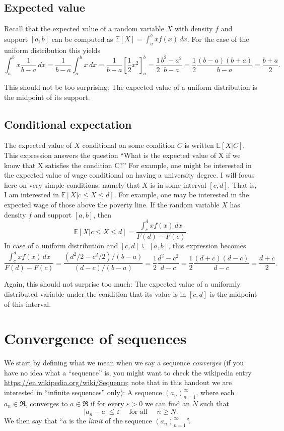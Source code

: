 \documentclass[a4paper,12pt]{article}
\theoremstyle{plain}
\begin{document}
\subsection{Expected value}
\label{sec:expected-value}

Recall that the expected value of a random variable $X$ with density $f$ and support $[a,b]$ can be computed as $\mathbb{E}[X]=\int_a^bxf(x)\,dx$. For the case of the uniform distribution this yields
$$\int_a^bx\frac{1}{b-a}\,dx=\frac{1}{b-a}\int_a^bx\,dx=\frac{1}{b-a} [\frac{1}{2}x^2]_a^b=\frac{1}{2}\frac{b^2-a^2}{b-a}=\frac{1}{2}\frac{(b-a)(b+a)}{b-a}=\frac{b+a}{2}.$$

This should not be too surprising: The expected value of a uniform distribution is the midpoint of its support. 

\subsection{Conditional expectation}
\label{sec:cond-expect}

The expected value of $X$ conditional on some condition $C$ is written $\mathbb{E}[X|C]$. This expression answers the question ``What is the expected value of X if we know that X satisfies the condition C?'' For example, one might be interested in the expected value of wage conditional on having a university degree. I will focus here on very simple conditions, namely that $X$ is in some interval $[c,d]$. That is, I am interested in $\mathbb{E}[X|c\leq X\leq d]$. For example, one may be interested in the expected wage of those above the poverty line. If the random variable $X$ has density $f$ and support $[a,b]$, then 
$$\mathbb{E}[X|c\leq X\leq d]=\frac{\int_c^dxf(x)\,dx}{F(d)-F(c)}.$$
In case of a uniform distribution and $[c,d]\subseteq[a,b]$, this expression becomes
$$\frac{\int_c^dxf(x)\,dx}{F(d)-F(c)}=\frac{(d^2/2-c^2/2)/(b-a)}{(d-c)/(b-a)}=\frac{1}{2}\frac{d^2-c^2}{d-c}=\frac{1}{2}\frac{(d+c)(d-c)}{d-c}=\frac{d+c}{2}.$$

Again, this should not surprise too much: The expected value of a uniformly distributed variable under the condition that its value is in $[c,d]$ is the midpoint of this interval. 

\section{Convergence of sequences}
\label{sec:conv-sequ}

We start by defining what we mean when we say a sequence \emph{converges} (if you have no idea what a ``sequence'' is, you might want to check the wikipedia entry \url{https://en.wikipedia.org/wiki/Sequence}; note that in this handout we are interested in ``infinite sequences'' only): A sequence $(a_n)_{n=1}^\infty$, where each $a_n\in \Re$, converges to $a\in \Re$ if for every $\varepsilon >0$ we can find an $N$ such that
\begin{equation}
  \label{eq:1}
  |a_n-a|\leq\varepsilon \quad\text{ for all }\quad n\geq N.
\end{equation}
We then say that ``$a$ is the \emph{limit} of the sequence $(a_n)_{n=1}^\infty$''.
\end{document}
